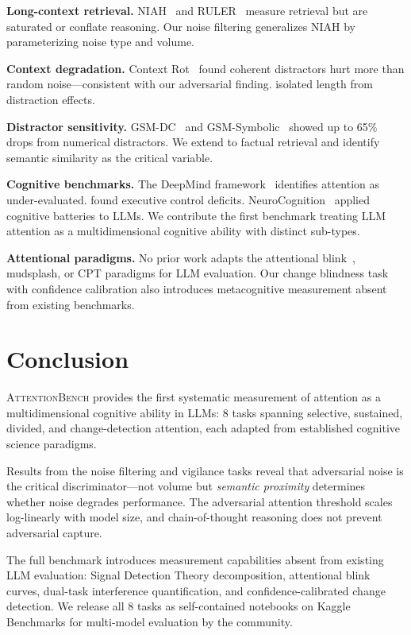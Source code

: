 \documentclass[11pt,twocolumn]{article}
\begin{document}
\textbf{Long-context retrieval.} NIAH~\citep{kamradt2023niah} and RULER~\citep{hsieh2024ruler} measure retrieval but are saturated or conflate reasoning. Our noise filtering generalizes NIAH by parameterizing noise type and volume.

\textbf{Context degradation.} Context Rot~\citep{hong2025contextrot} found coherent distractors hurt more than random noise---consistent with our adversarial finding. \citet{du2025context} isolated length from distraction effects.

\textbf{Distractor sensitivity.} GSM-DC~\citep{li2025gsmdc} and GSM-Symbolic~\citep{mirzadeh2025gsm} showed up to 65\% drops from numerical distractors. We extend to factual retrieval and identify semantic similarity as the critical variable.

\textbf{Cognitive benchmarks.} The DeepMind framework~\citep{burnell2026agi} identifies attention as under-evaluated. \citet{delangis2025strong} found executive control deficits. NeuroCognition~\citep{neurocog2026} applied cognitive batteries to LLMs. We contribute the first benchmark treating LLM attention as a multidimensional cognitive ability with distinct sub-types.

\textbf{Attentional paradigms.} No prior work adapts the attentional blink~\citep{raymond1992}, mudsplash, or CPT paradigms for LLM evaluation. Our change blindness task with confidence calibration also introduces metacognitive measurement absent from existing benchmarks.

\section{Conclusion}

\textsc{AttentionBench} provides the first systematic measurement of attention as a multidimensional cognitive ability in LLMs: 8 tasks spanning selective, sustained, divided, and change-detection attention, each adapted from established cognitive science paradigms.

Results from the noise filtering and vigilance tasks reveal that adversarial noise is the critical discriminator---not volume but \emph{semantic proximity} determines whether noise degrades performance. The adversarial attention threshold scales log-linearly with model size, and chain-of-thought reasoning does not prevent adversarial capture.

The full benchmark introduces measurement capabilities absent from existing LLM evaluation: Signal Detection Theory decomposition, attentional blink curves, dual-task interference quantification, and confidence-calibrated change detection. We release all 8 tasks as self-contained notebooks on Kaggle Benchmarks for multi-model evaluation by the community.
\end{document}
